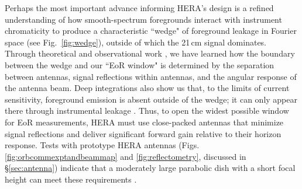 \documentclass[preprint,11pt]{aastex}
\begin{document}
Perhaps the most important advance informing HERA's design is a
refined understanding of how smooth-spectrum foregrounds interact
with instrument chromaticity to produce a characteristic ``wedge" of
foreground leakage in Fourier space (see Fig.~\ref{fig:wedge}), 
outside of which the 21\,cm signal dominates.
Through theoretical and observational work
\citep{Datta_2010,morales_et_al2012,parsons_et_al2012b,vedantham_2012,thyagarajan_et_al2013,hazelton_et_al2013,pober_et_al2013b,liu_et_al2014a,liu_et_al2014b},
we have learned how the boundary between the wedge and our ``EoR window" is determined by the separation between antennas,
signal reflections within antennas, and the angular response of the antenna beam.  Deep integrations also show us
that, to the limits of current sensitivity, foreground emission is absent outside of the wedge; it can only 
appear there through instrumental leakage \citep{parsons_et_al2014,ali_et_al2015,moore_et_al2016,kohn_et_al2016}.
Thus, to open the widest possible window for EoR measurements, HERA must use close-packed antennas that
minimize signal reflections and deliver significant forward gain relative to their horizon response.
Tests with prototype HERA antennas (Figs. \ref{fig:orbcommexptandbeammap} and \ref{fig:reflectometry}, discussed in \S\ref{sec:antenna})
indicate that a moderately large parabolic dish with a short focal height can meet these requirements
\citep{ewall-wice_et_al2016-EoXLimits,neben_et_al2016,thyagarajan_et_al2016}.
\end{document}

